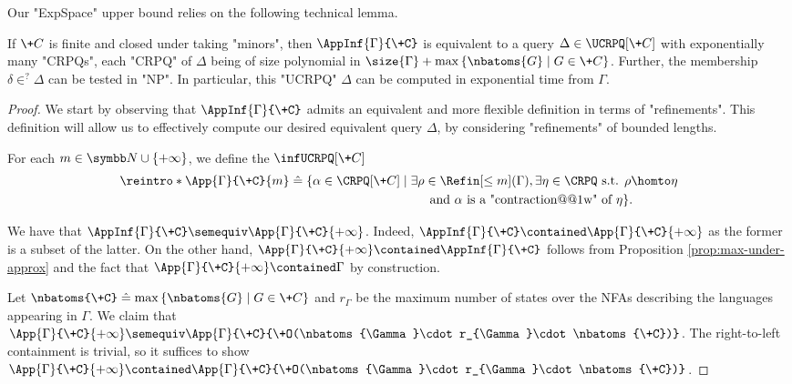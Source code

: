 Our "ExpSpace" upper bound relies on the following technical lemma.

\begin{lemma}
	\AP\label{lemma:approximation-for-finclass}
	If $\+C$ is finite and closed under taking "minors", then $\AppInf{\Gamma}{\+C}$ is equivalent to a query $\Delta\in \UCRPQ[\+C]$ with exponentially many "CRPQs", each "CRPQ" of $\Delta$ being of size polynomial in $\size{\Gamma} + \max{\set{\nbatoms{G} \mid G \in \+C}}$.
	Further, the membership $\delta \in^? \Delta$ can be tested in "NP". 
	In particular, this "UCRPQ" $\Delta$ can be computed in exponential time from $\Gamma$.
\end{lemma}

\begin{proof}
	We start by observing that $\AppInf{\Gamma}{\+C}$ admits an equivalent and more flexible definition in terms of "refinements". This definition will allow us to effectively compute our desired equivalent query $\Delta$, by considering "refinements" of bounded lengths.

	For each $m \in \N\cup\{+\infty\}$, we define the $\infUCRPQ[\+C]$
	\AP{}
	\begin{align*}
	\reintro*\App{\Gamma}{\+C}{m} \defeq \{
		\alpha \in \CRPQ[\+C] & \mid \exists \rho \in \Refin[\leq m](\Gamma), 
		\exists \eta \in \CRPQ \text{ s.t. }
		\rho \homto \eta \\
		& \qquad \text{ and } \alpha \text{ is a "contraction@@1w" of } \eta
	\}.
	\end{align*}

	We have that $\AppInf{\Gamma}{\+C}\semequiv \App{\Gamma}{\+C}{+\infty}$. Indeed, $\AppInf{\Gamma}{\+C}\contained \App{\Gamma}{\+C}{+\infty}$ as the former is a subset of the latter. On the other hand, $\App{\Gamma}{\+C}{+\infty}\contained \AppInf{\Gamma}{\+C}$ follows from Proposition \ref{prop:max-under-approx} and the fact that $\App{\Gamma}{\+C}{+\infty}\contained \Gamma$ by construction.
	
	Let $\nbatoms{\+C}\defeq \max{\set{\nbatoms{G} \mid G \in \+C}}$ and $r_{\Gamma}$ be the maximum number of states over the NFAs describing the languages appearing in $\Gamma$. 
	We claim that $\App{\Gamma}{\+C}{+\infty} \semequiv \App{\Gamma}{\+C}{\+O(\nbatoms{\Gamma}\cdot r_{\Gamma}\cdot \nbatoms{\+C})}$.
	The right-to-left containment is trivial, so it suffices to show
	$\App{\Gamma}{\+C}{+\infty} \contained \App{\Gamma}{\+C}{\+O(\nbatoms{\Gamma}\cdot r_{\Gamma}\cdot \nbatoms{\+C})}$.


\end{proof}

